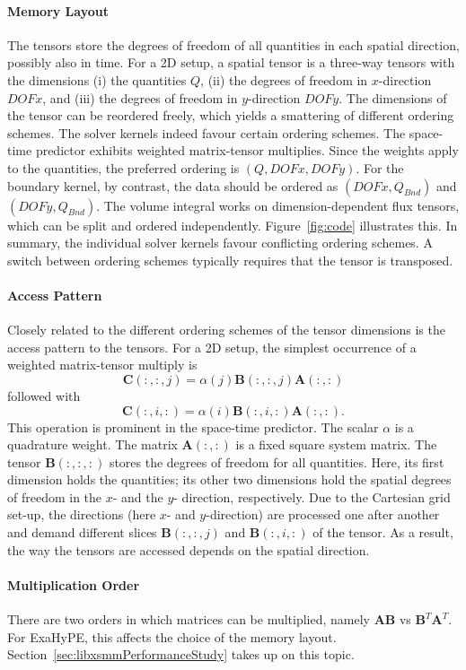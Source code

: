 \documentclass{acm_proc_article-sp}
\begin{document}
\paragraph{Memory Layout}\label{paragraph:memorylayout}
The tensors store the degrees of freedom of all quantities in each spatial direction, possibly also in time. For a 2D setup, a spatial tensor is a three-way tensors with the dimensions (i) the quantities $Q$, (ii) the degrees of freedom in $x$-direction $DOFx$, and (iii) the degrees of freedom in $y$-direction $DOFy$. The dimensions of the tensor can be reordered freely, which yields a smattering of different ordering schemes. The solver kernels indeed favour certain ordering schemes. The space-time predictor exhibits weighted matrix-tensor multiplies. Since the weights apply to the quantities, the preferred ordering is $(Q,DOFx,DOFy)$. For the boundary kernel, by contrast, the data should be ordered as $(DOFx,Q_{Bnd})$ and $(DOFy, Q_{Bnd})$. The volume integral works on dimension-dependent flux tensors, which can be split and ordered independently. Figure~\ref{fig:code} illustrates this. In summary, the individual solver kernels favour conflicting ordering schemes. A switch between ordering schemes typically requires that the tensor is transposed.


\paragraph{Access Pattern}\label{paragraph:accesspattern}
Closely related to the different ordering schemes of the tensor dimensions is the access pattern to the tensors. For a 2D setup, the simplest occurrence of a weighted matrix-tensor multiply is
$$\mathbf{C}(:,:,j) = \alpha(j) \mathbf{B}(:,:,j) \mathbf{A}(:,:)$$ followed with $$\mathbf{C}(:,i,:) = \alpha(i) \mathbf{B}(:,i,:)\mathbf{A}(:,:).$$ 
This operation is prominent in the space-time predictor. The scalar $\alpha$ is a quadrature weight. The matrix $\mathbf{A}(:,:)$ is a fixed square system matrix. The tensor $\mathbf{B}(:,:,:)$ stores the degrees of freedom for all quantities. Here, its first dimension holds the quantities; its other two dimensions hold the spatial degrees of freedom in the $x$- and the $y$- direction, respectively. Due to the Cartesian grid set-up, the directions (here $x$- and $y$-direction) are processed one after another and demand different slices $\mathbf{B}(:,:,j)$ and $\mathbf{B}(:,i,:)$ of the tensor. As a result, the way the tensors are accessed depends on the  spatial direction.
\paragraph{Multiplication Order}\label{paragraph:multiplicationorder}
There are two orders in which matrices can be multiplied, namely $\mathbf{A}\mathbf{B}$ vs $\mathbf{B}^T \mathbf{A}^T$. For ExaHyPE, this affects the choice of the memory layout. Section~\ref{sec:libxsmmPerformanceStudy} takes up on this topic. 
\end{document}

